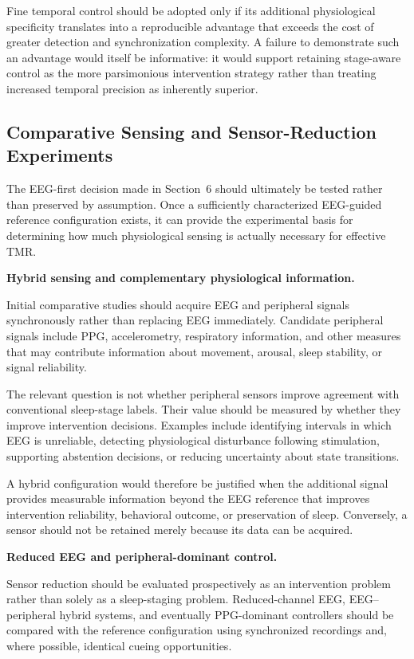 Fine temporal control should be adopted only if its additional physiological
specificity translates into a reproducible advantage that exceeds the cost of
greater detection and synchronization complexity. A failure to demonstrate such
an advantage would itself be informative: it would support retaining
stage-aware control as the more parsimonious intervention strategy rather than
treating increased temporal precision as inherently superior.


\subsection{Comparative Sensing and Sensor-Reduction Experiments}

The EEG-first decision made in Section~6 should ultimately be tested rather than
preserved by assumption. Once a sufficiently characterized EEG-guided reference
configuration exists, it can provide the experimental basis for determining how
much physiological sensing is actually necessary for effective TMR.

\noindent\textbf{Hybrid sensing and complementary physiological information.}

Initial comparative studies should acquire EEG and peripheral signals
synchronously rather than replacing EEG immediately. Candidate peripheral
signals include PPG, accelerometry, respiratory information, and other measures
that may contribute information about movement, arousal, sleep stability, or
signal reliability.

The relevant question is not whether peripheral sensors improve agreement with
conventional sleep-stage labels. Their value should be measured by whether they
improve intervention decisions. Examples include identifying intervals in which
EEG is unreliable, detecting physiological disturbance following stimulation,
supporting abstention decisions, or reducing uncertainty about state
transitions.

A hybrid configuration would therefore be justified when the additional signal
provides measurable information beyond the EEG reference that improves
intervention reliability, behavioral outcome, or preservation of sleep.
Conversely, a sensor should not be retained merely because its data can be
acquired.

\noindent\textbf{Reduced EEG and peripheral-dominant control.}

Sensor reduction should be evaluated prospectively as an intervention problem
rather than solely as a sleep-staging problem. Reduced-channel EEG,
EEG--peripheral hybrid systems, and eventually PPG-dominant controllers should
be compared with the reference configuration using synchronized recordings and,
where possible, identical cueing opportunities.


